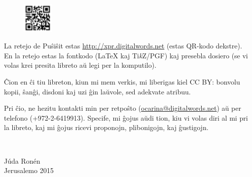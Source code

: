 
\begin{figure}\vspace{-\baselineskip}\includegraphics[width=1.5cm]{retejo.png}\end{figure}
La retejo de Puŝiŝit estas \url{http://xpr.digitalwords.net} (estas QR-kodo dekstre). En la retejo estas la fontkodo ({\LaTeX} kaj {Ti\textit{k}Z/PGF}) kaj presebla dosiero (se vi volas krei presita libreto aŭ legi per la komputilo).

Ĉion en ĉi tiu libreton, kiun mi mem verkis, mi liberigas kiel CC BY: bonvolu kopii, ŝanĝi, disdoni kaj uzi ĝin laŭvole, sed adekvate atribuu.

Pri ĉio, ne hezitu kontakti min per retpoŝto (\url{ocarina@digitalwords.net}) aŭ per telefono (+972-2-6419913). Specife, mi ĝojus aŭdi tion, kiu vi volas diri al mi pri la libreto, kaj mi ĝojus ricevi proponojn, plibonigojn, kaj ĝustigojn.


\vspace{\baselineskip}
~\hfill
\begin{minipage}{3cm}
	Júda Ronén\\
	Jerusalemo 2015\\
\end{minipage}

